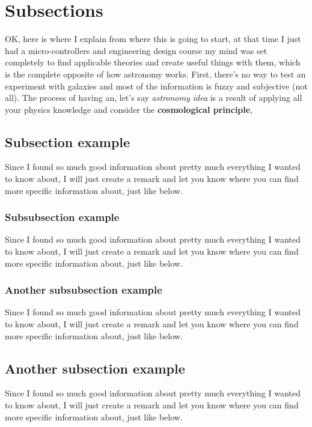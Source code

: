 \section{Subsections}
OK, here is where I explain from where this is going to start, at that time I just had a micro-controllers and engineering design 
course my mind was set completely to find applicable theories and create useful things with them, which is the complete opposite of how astronomy works. 
First, there's no way to test an experiment with galaxies and most of the information is fuzzy and subjective (not all). 
The process of having an, let's say \emph{astronomy idea} is a result of applying all your physics knowledge and consider the \textbf{cosmological principle},

\subsection{Subsection example}
Since I found so much good information about pretty much everything I wanted to know about, I will just create a remark and let 
you know where you can find more specific information about, just like below.

\subsubsection{Subsubsection example}
Since I found so much good information about pretty much everything I wanted to know about, I will just create a remark 
and let you know where you can find more specific information about, just like below.

\subsubsection{Another subsubsection example}
Since I found so much good information about pretty much everything I wanted to know about, I will just create a remark 
and let you know where you can find more specific information about, just like below.

\subsection{Another subsection example}
Since I found so much good information about pretty much everything I wanted to know about, I will just create a remark 
and let you know where you can find more specific information about, just like below.

